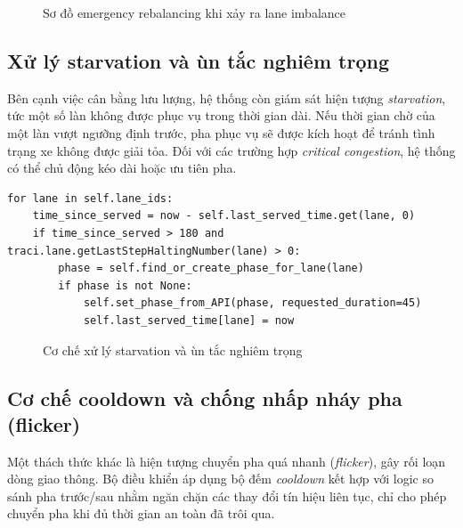 \begin{figure}[H]
    \centering
    \caption{Sơ đồ emergency rebalancing khi xảy ra lane imbalance}
\end{figure}

\subsection{Xử lý starvation và ùn tắc nghiêm trọng}

Bên cạnh việc cân bằng lưu lượng, hệ thống còn giám sát hiện tượng \textit{starvation}, tức một số làn không được phục vụ trong thời gian dài. Nếu thời gian chờ của một làn vượt ngưỡng định trước, pha phục vụ sẽ được kích hoạt để tránh tình trạng xe không được giải tỏa. Đối với các trường hợp \textit{critical congestion}, hệ thống có thể chủ động kéo dài hoặc ưu tiên pha.

\begin{lstlisting}[style=py,caption={Thuật toán xử lý starvation và critical congestion}]
for lane in self.lane_ids:
    time_since_served = now - self.last_served_time.get(lane, 0)
    if time_since_served > 180 and traci.lane.getLastStepHaltingNumber(lane) > 0:
        phase = self.find_or_create_phase_for_lane(lane)
        if phase is not None:
            self.set_phase_from_API(phase, requested_duration=45)
            self.last_served_time[lane] = now
\end{lstlisting}

\begin{figure}[H]
    \centering
    \caption{Cơ chế xử lý starvation và ùn tắc nghiêm trọng}
\end{figure}

\subsection{Cơ chế cooldown và chống nhấp nháy pha (flicker)}

Một thách thức khác là hiện tượng chuyển pha quá nhanh (\textit{flicker}), gây rối loạn dòng giao thông. Bộ điều khiển áp dụng bộ đếm \textit{cooldown} kết hợp với logic so sánh pha trước/sau nhằm ngăn chặn các thay đổi tín hiệu liên tục, chỉ cho phép chuyển pha khi đủ thời gian an toàn đã trôi qua.

